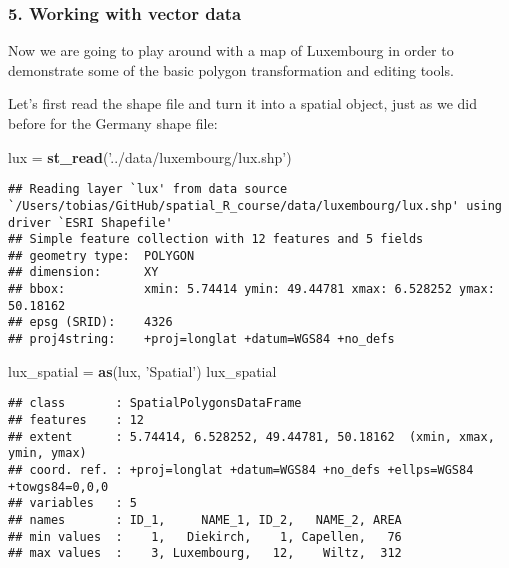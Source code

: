 \documentclass[]{article}
\newenvironment{Shaded}{\begin{snugshade}}{\end{snugshade}}
\newcommand{\KeywordTok}[1]{\textcolor[rgb]{0.13,0.29,0.53}{\textbf{#1}}}
\newcommand{\NormalTok}[1]{#1}
\newcommand{\StringTok}[1]{\textcolor[rgb]{0.31,0.60,0.02}{#1}}
\begin{document}
\hypertarget{working-with-vector-data}{%
\subsubsection{5. Working with vector
data}\label{working-with-vector-data}}

Now we are going to play around with a map of Luxembourg in order to
demonstrate some of the basic polygon transformation and editing tools.

Let's first read the shape file and turn it into a spatial object, just
as we did before for the Germany shape file:

\begin{Shaded}
\begin{Highlighting}[]
\NormalTok{lux =}\StringTok{ }\KeywordTok{st_read}\NormalTok{(}\StringTok{'../data/luxembourg/lux.shp'}\NormalTok{)}
\end{Highlighting}
\end{Shaded}

\begin{verbatim}
## Reading layer `lux' from data source `/Users/tobias/GitHub/spatial_R_course/data/luxembourg/lux.shp' using driver `ESRI Shapefile'
## Simple feature collection with 12 features and 5 fields
## geometry type:  POLYGON
## dimension:      XY
## bbox:           xmin: 5.74414 ymin: 49.44781 xmax: 6.528252 ymax: 50.18162
## epsg (SRID):    4326
## proj4string:    +proj=longlat +datum=WGS84 +no_defs
\end{verbatim}

\begin{Shaded}
\begin{Highlighting}[]
\NormalTok{lux_spatial =}\StringTok{ }\KeywordTok{as}\NormalTok{(lux, }\StringTok{'Spatial'}\NormalTok{)}
\NormalTok{lux_spatial}
\end{Highlighting}
\end{Shaded}

\begin{verbatim}
## class       : SpatialPolygonsDataFrame 
## features    : 12 
## extent      : 5.74414, 6.528252, 49.44781, 50.18162  (xmin, xmax, ymin, ymax)
## coord. ref. : +proj=longlat +datum=WGS84 +no_defs +ellps=WGS84 +towgs84=0,0,0 
## variables   : 5
## names       : ID_1,     NAME_1, ID_2,   NAME_2, AREA 
## min values  :    1,   Diekirch,    1, Capellen,   76 
## max values  :    3, Luxembourg,   12,    Wiltz,  312
\end{verbatim}
\end{document}
